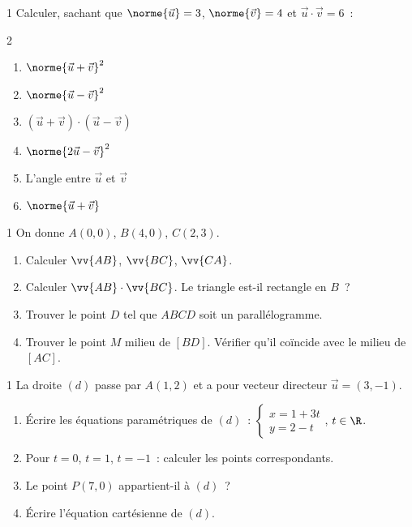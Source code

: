 \begin{exo}{1}
Calculer, sachant que $\norme{\vec{u}}=3$, $\norme{\vec{v}}=4$
et $\vec{u}\cdot\vec{v}=6$~:
\begin{multicols}{2}
\begin{enumerate}
  \item $\norme{\vec{u}+\vec{v}}^2$
  \item $\norme{\vec{u}-\vec{v}}^2$
  \item $(\vec{u}+\vec{v})\cdot(\vec{u}-\vec{v})$
  \item $\norme{2\vec{u}-\vec{v}}^2$
  \item L'angle entre $\vec{u}$ et $\vec{v}$
  \item $\norme{\vec{u}+\vec{v}}$
\end{enumerate}
\end{multicols}
\end{exo}

\begin{exo}{1}
On donne $A(0,0)$, $B(4,0)$, $C(2,3)$.
\begin{enumerate}
  \item Calculer $\vv{AB}$, $\vv{BC}$, $\vv{CA}$.
  \item Calculer $\vv{AB}\cdot\vv{BC}$.
        Le triangle est-il rectangle en $B$~?
  \item Trouver le point $D$ tel que $ABCD$ soit un parall\'elogramme.
  \item Trouver le point $M$ milieu de $[BD]$.
        V\'erifier qu'il co\"incide avec le milieu de $[AC]$.
\end{enumerate}
\end{exo}

\begin{exo}{1}
La droite $(d)$ passe par $A(1,2)$ et a pour vecteur directeur $\vec{u}=(3,-1)$.
\begin{enumerate}
  \item \'Ecrire les \'equations param\'etriques de $(d)$~:
        $\begin{cases}x=1+3t\\y=2-t\end{cases}$, $t\in\R$.
  \item Pour $t=0$, $t=1$, $t=-1$~: calculer les points correspondants.
  \item Le point $P(7,0)$ appartient-il \`a $(d)$~?
  \item \'Ecrire l'\'equation cart\'esienne de $(d)$.
\end{enumerate}
\end{exo}


